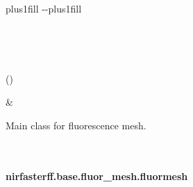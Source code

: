 \documentclass[letterpaper,10pt,english]{sphinxmanual}
\begin{document}
\begin{savenotes}
\sphinxatlongtablestart
\sphinxthistablewithglobalstyle
\sphinxthistablewithnovlinesstyle
\makeatletter
  \LTleft \@totalleftmargin plus1fill
  \LTright\dimexpr\columnwidth-\@totalleftmargin-\linewidth\relax plus1fill
\makeatother
\begin{longtable}{}
\sphinxtoprule
\endfirsthead

\\
\sphinxtoprule
\endhead

\sphinxbottomrule
{}\\
\endfoot

\endlastfoot
\sphinxtableatstartofbodyhook
\begin{varwidth}[t]{}
\sphinxAtStartPar
{\hyperref[\detokenize{_autosummary/nirfasterff.base.fluor_mesh.fluormesh:nirfasterff.base.fluor_mesh.fluormesh}]{}}()
\sphinxbeforeendvarwidth
\end{varwidth}%
&\begin{varwidth}[t]{}
\sphinxAtStartPar
Main class for fluorescence mesh.
\sphinxbeforeendvarwidth
\end{varwidth}%
\\
\sphinxbottomrule
\end{longtable}
\sphinxtableafterendhook
\sphinxatlongtableend
\end{savenotes}

\sphinxstepscope


\paragraph{nirfasterff.base.fluor\_mesh.fluormesh}
\label{\detokenize{_autosummary/nirfasterff.base.fluor_mesh.fluormesh:nirfasterff-base-fluor-mesh-fluormesh}}\label{\detokenize{_autosummary/nirfasterff.base.fluor_mesh.fluormesh::doc}}
\end{document}
